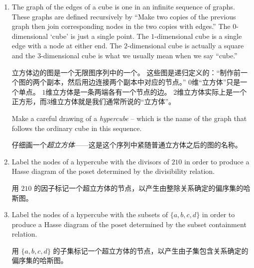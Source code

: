 \begin{enumerate}
    \wbvfill
    
    \workbookpagebreak
    
    \item The graph of the edges of a cube is one in an infinite sequence of 
    graphs.
    These graphs are defined 
    recursively by ``Make two copies of the previous graph then join 
    corresponding nodes in the two copies with edges.''  The $0$-dimensional
    `cube' is just a single point.
    The $1$-dimensional cube is a single edge
    with a node at either end.
    The $2$-dimensional cube is actually a square
    and the $3$-dimensional cube is what we usually mean when we say ``cube.''
    
    \noindent 立方体边的图是一个无限图序列中的一个。
    这些图是递归定义的：“制作前一个图的两个副本，然后用边连接两个副本中对应的节点。” $0$维“立方体”只是一个单点。
    $1$维立方体是一条两端各有一个节点的边。
    $2$维立方体实际上是一个正方形，而$3$维立方体就是我们通常所说的“立方体”。
    
    \begin{center}
    
    \end{center}
    
    Make a careful drawing of a \emph{hypercube} -- which is
    the name of the graph that follows the ordinary cube in this sequence.
    
    \noindent 仔细画一个\emph{超立方体}——这是这个序列中紧随普通立方体之后的图的名称。
    
    \wbvfill
    
    \workbookpagebreak
    
    \item Label the nodes of a hypercube with the divisors of $210$ in order to
    produce a Hasse diagram of the poset determined by the divisibility relation.
    
    \noindent 用 $210$ 的因子标记一个超立方体的节点，以产生由整除关系确定的偏序集的哈斯图。
    
    \wbvfill
    
    
    \item Label the nodes of a hypercube with the subsets of $\{a,b,c,d\}$ 
    in order to produce a Hasse diagram of the poset determined by the 
    subset containment relation.
    
    \noindent 用 $\{a,b,c,d\}$ 的子集标记一个超立方体的节点，以产生由子集包含关系确定的偏序集的哈斯图。
    

\end{enumerate}
